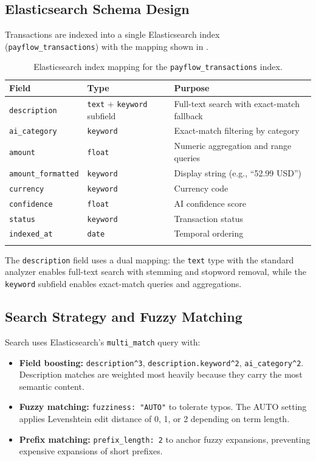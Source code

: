 \documentclass[11pt,a4paper]{article}
\begin{document}
\subsection{Elasticsearch Schema Design}
\label{subsec:es-schema}

Transactions are indexed into a single Elasticsearch index (\texttt{payflow\_transactions}) with the mapping shown in .

\begin{table}[ht]
  \centering
  \begin{tabular}{llp{7cm}}
  \toprule
  \textbf{Field} & \textbf{Type} & \textbf{Purpose} \\
  \midrule
  \texttt{description} & \texttt{text} + \texttt{keyword} subfield & Full-text search with exact-match fallback \\
  \texttt{ai\_category} & \texttt{keyword} & Exact-match filtering by category \\
  \texttt{amount} & \texttt{float} & Numeric aggregation and range queries \\
  \texttt{amount\_formatted} & \texttt{keyword} & Display string (e.g., ``52.99 USD'') \\
  \texttt{currency} & \texttt{keyword} & Currency code \\
  \texttt{confidence} & \texttt{float} & AI confidence score \\
  \texttt{status} & \texttt{keyword} & Transaction status \\
  \texttt{indexed\_at} & \texttt{date} & Temporal ordering \\
  \bottomrule
  \caption{Elasticsearch index mapping for the \texttt{payflow\_transactions} index.}
  \label{tab:es-schema}
  \end{tabular}
\end{table}

The \texttt{description} field uses a dual mapping: the \texttt{text} type with the standard analyzer enables full-text search with stemming and stopword removal, while the \texttt{keyword} subfield enables exact-match queries and aggregations.

\subsection{Search Strategy and Fuzzy Matching}
\label{subsec:search}

Search uses Elasticsearch's \texttt{multi\_match} query with:

\begin{itemize}[leftmargin=*]
  \item \textbf{Field boosting:} \texttt{description\^{}3}, \texttt{description.keyword\^{}2}, \texttt{ai\_category\^{}2}. Description matches are weighted most heavily because they carry the most semantic content.
  \item \textbf{Fuzzy matching:} \texttt{fuzziness: "AUTO"} to tolerate typos. The AUTO setting applies Levenshtein edit distance of 0, 1, or 2 depending on term length.
  \item \textbf{Prefix matching:} \texttt{prefix\_length: 2} to anchor fuzzy expansions, preventing expensive expansions of short prefixes.
\end{itemize}
\end{document}

